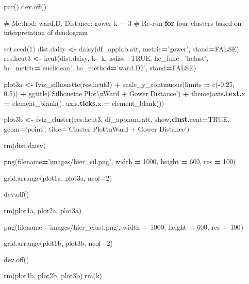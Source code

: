 \documentclass[]{article}
\newenvironment{Shaded}{\begin{snugshade}}{\end{snugshade}}
\newcommand{\KeywordTok}[1]{\textcolor[rgb]{0.13,0.29,0.53}{\textbf{{#1}}}}
\newcommand{\DecValTok}[1]{\textcolor[rgb]{0.00,0.00,0.81}{{#1}}}
\newcommand{\FloatTok}[1]{\textcolor[rgb]{0.00,0.00,0.81}{{#1}}}
\newcommand{\StringTok}[1]{\textcolor[rgb]{0.31,0.60,0.02}{{#1}}}
\newcommand{\OtherTok}[1]{\textcolor[rgb]{0.56,0.35,0.01}{{#1}}}
\newcommand{\NormalTok}[1]{{#1}}
\begin{document}
\begin{Shaded}
\begin{Highlighting}[]
\NormalTok{par()}
\NormalTok{dev.off()}


\OtherTok{# Method: ward.D, Distance: gower}
\NormalTok{k }\KeywordTok{=} \DecValTok{3} \NormalTok{# Re}\KeywordTok{-}\NormalTok{run }\KeywordTok{for} \NormalTok{four clusters based on interpretation of dendogram}

\NormalTok{set.seed(}\DecValTok{1}\NormalTok{)}
\NormalTok{dist.daisy }\KeywordTok{<-} \NormalTok{daisy(df_applab.att, metric}\KeywordTok{=}\StringTok{'gower'}\NormalTok{, stand}\KeywordTok{=}\NormalTok{FALSE)}
\NormalTok{res.hcut3 }\KeywordTok{<-} \NormalTok{hcut(dist.daisy, k}\KeywordTok{=}\NormalTok{k, isdiss}\KeywordTok{=}\NormalTok{TRUE,}
                  \NormalTok{hc_func}\KeywordTok{=}\StringTok{'hclust'}\NormalTok{, hc_metric}\KeywordTok{=}\StringTok{'euclidean'}\NormalTok{,}
                  \NormalTok{hc_method}\KeywordTok{=}\StringTok{'ward.D2'}\NormalTok{, stand}\KeywordTok{=}\NormalTok{FALSE)}

\NormalTok{plot3a }\KeywordTok{<-} \NormalTok{fviz_silhouette(res.hcut3) }\KeywordTok{+}
  \NormalTok{scale_y_continuous(limits }\KeywordTok{=} \NormalTok{c(}\KeywordTok{-}\FloatTok{0.25}\NormalTok{, }\FloatTok{0.5}\NormalTok{)) }\KeywordTok{+}
  \NormalTok{ggtitle(}\StringTok{'Silhouette Plot\textbackslash{}nWard + Gower Distance'}\NormalTok{) }\KeywordTok{+}
  \NormalTok{theme(axis}\KeywordTok{.text.}\NormalTok{x }\KeywordTok{=} \NormalTok{element_blank(), axis}\KeywordTok{.ticks.}\NormalTok{x }\KeywordTok{=} \NormalTok{element_blank())}

\NormalTok{plot3b }\KeywordTok{<-} \NormalTok{fviz_cluster(res.hcut3, df_appnum.att, }
                       \NormalTok{show}\KeywordTok{.clust.}\NormalTok{cent}\KeywordTok{=}\NormalTok{TRUE, geom}\KeywordTok{=}\StringTok{'point'}\NormalTok{,}
                       \NormalTok{title}\KeywordTok{=}\StringTok{'Cluster Plot\textbackslash{}nWard + Gower Distance'}\NormalTok{)}

\NormalTok{rm(dist.daisy)}


\NormalTok{png(filename}\KeywordTok{=}\StringTok{'images/hier_sil.png'}\NormalTok{, }
    \NormalTok{width }\KeywordTok{=} \DecValTok{1000}\NormalTok{, height }\KeywordTok{=} \DecValTok{600}\NormalTok{, res }\KeywordTok{=} \DecValTok{100}\NormalTok{)}

\NormalTok{grid.arrange(plot1a, plot3a, ncol}\KeywordTok{=}\DecValTok{2}\NormalTok{)}

\NormalTok{dev.off()}

\NormalTok{rm(plot1a, plot2a, plot3a)}

\NormalTok{png(filename}\KeywordTok{=}\StringTok{'images/hier_clust.png'}\NormalTok{, }
    \NormalTok{width }\KeywordTok{=} \DecValTok{1000}\NormalTok{, height }\KeywordTok{=} \DecValTok{600}\NormalTok{, res }\KeywordTok{=} \DecValTok{100}\NormalTok{)}

\NormalTok{grid.arrange(plot1b, plot3b, ncol}\KeywordTok{=}\DecValTok{2}\NormalTok{)}

\NormalTok{dev.off()}

\NormalTok{rm(plot1b, plot2b, plot3b)}
\NormalTok{rm(k)}
\end{Highlighting}
\end{Shaded}
\end{document}
